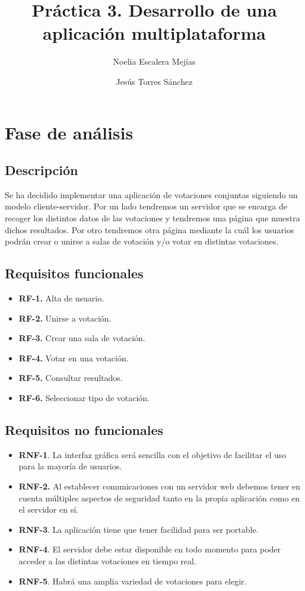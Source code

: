 \documentclass{article}
\title{Práctica 3. Desarrollo de una aplicación multiplataforma}
\author{Noelia Escalera Mejías \and Jesús Torres Sánchez}
\begin{document}
	\maketitle
	\tableofcontents
	\newpage
	
	\section{Fase de análisis}
	\subsection{Descripción}
	Se ha decidido implementar una aplicación de votaciones conjuntas siguiendo un modelo cliente-servidor. Por un lado tendremos un servidor que se encarga de recoger los distintos datos de las votaciones y tendremos una página que muestra dichos resultados. Por otro tendremos otra página mediante la cuál los usuarios podrán crear o unirse a salas de votación y/o votar en distintas votaciones.
	
	\subsection{Requisitos funcionales}
	\begin{itemize}
		\item \textbf{RF-1.} Alta de usuario.
		\item \textbf{RF-2.} Unirse a votación.
		\item \textbf{RF-3.} Crear una sala de votación.
		\item \textbf{RF-4.} Votar en una votación.
		\item \textbf{RF-5.} Consultar resultados.
		\item \textbf{RF-6.} Seleccionar tipo de votación. \\
	\end{itemize}
	
	\subsection{Requisitos no funcionales}
	\begin{itemize}
		\item \textbf{RNF-1}. La interfaz gráfica será sencilla con el objetivo de facilitar el uso para la mayoría de usuarios.
		\item \textbf{RNF-2.} Al establecer comunicaciones con un servidor web debemos tener
		en cuenta múltiples aspectos de seguridad tanto en la propia aplicación
		como en el servidor en sí.
		\item \textbf{RNF-3}. La aplicación tiene que tener facilidad para ser portable.
		\item \textbf{RNF-4}. El servidor debe estar disponible en todo momento para poder
		acceder a las distintas votaciones en tiempo real.
		\item \textbf{RNF-5}. Habrá una amplia variedad de votaciones para elegir.
	\end{itemize}
\end{document}
